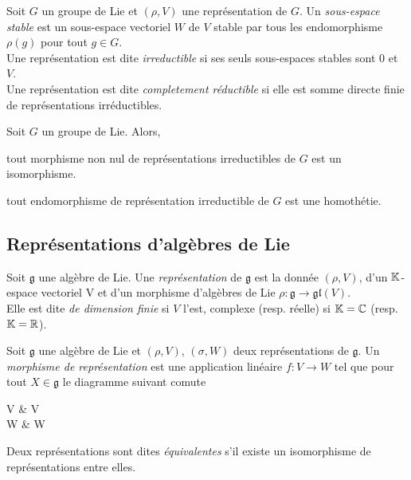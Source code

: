 \begin{definition}
    Soit $G$ un groupe de Lie et $(\rho, V)$ une représentation de $G$. Un \emph{sous-espace stable} est un sous-espace vectoriel $W$ de $V$ stable par tous les endomorphisme $\rho(g)$ pour tout $g\in G$. \\
    Une représentation est dite \emph{irreductible} si ses seuls sous-espaces stables sont $0$ et $V$. \\
    Une représentation est dite \emph{completement réductible} si elle est somme directe finie de représentations irréductibles.
\end{definition}

\begin{lemma}
    Soit $G$ un groupe de Lie. Alors,
    \begin{ilist}
        \item tout morphisme non nul de représentations irreductibles de $G$ est un isomorphisme.
        \item tout endomorphisme de représentation irreductible de $G$ est une homothétie.
    \end{ilist}
\end{lemma}

\subsection{Représentations d'algèbres de Lie}

\begin{definition}
    Soit $\mathfrak{g}$ une algèbre de Lie. Une \emph{représentation} de $\mathfrak{g}$ est la donnée $(\rho, V)$, d'un $\mathbb{K}$-espace vectoriel V et d'un morphisme d'algèbres de Lie $\rho : \mathfrak{g} \to \mathfrak{gl}(V)$. \\
    Elle est dite \emph{de dimension finie} si $V$ l'est, complexe (resp. réelle) si $\mathbb{K} = \mathbb{C}$ (resp. $\mathbb{K} = \mathbb{R}$).
\end{definition}

\begin{definition}
    Soit $\mathfrak{g}$ une algèbre de Lie et $(\rho, V)$, $(\sigma, W)$ deux représentations de $\mathfrak{g}$. Un \emph{morphisme de représentation} est une application linéaire $f: V \to W$ tel que pour tout $X\in \mathfrak{g}$ le diagramme suivant comute 
    \begin{diag}
        V \arrow[d, "f"] \arrow[r, "\rho(X)"] & V \arrow[d, "f"] \\
        W \arrow[r, "\sigma(X)"] & W
    \end{diag}
    Deux représentations sont dites \emph{équivalentes} s'il existe un isomorphisme de représentations entre elles.
\end{definition}

